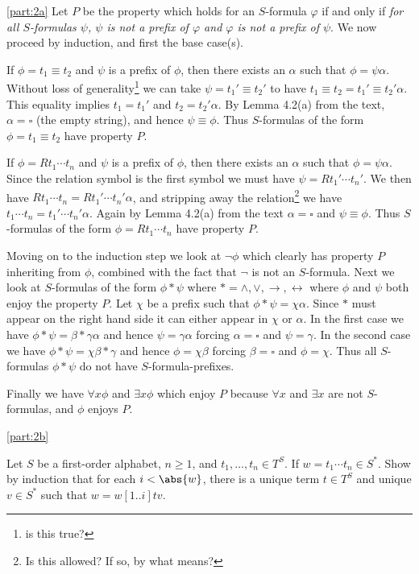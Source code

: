 \documentclass[boxes,pages,color=CornflowerBlue]{homework}
\begin{document}
\begin{solution}
    \ref{part:2a}
    Let $P$ be the property which holds for an $S$-formula $\varphi$ if and only if \emph{for all $S$-formulas $\psi$, $\psi$ is not a prefix of $\varphi$ and $\varphi$ is not a prefix of $\psi$}.
    We now proceed by induction, and first the base case(s).

    If $\phi = t_1 \equiv t_2$ and $\psi$ is a prefix of $\phi$, then there exists an $\alpha$ such that $\phi = \psi\alpha$.
    Without loss of generality\footnote{is this true?} we can take $\psi = t_1' \equiv t_2'$ to have $t_1 \equiv t_2 = t_1' \equiv t_2'\alpha$.
    This equality implies $t_1 = t_1'$ and $t_2 = t_2'\alpha$.
    By Lemma 4.2(a) from the text, $\alpha = \square$ (the empty string), and hence $\psi \equiv \phi$.
    Thus $S$-formulas of the form $\phi = t_1 \equiv t_2$ have property $P$.

    If $\phi = Rt_1\cdots t_n$ and $\psi$ is a prefix of $\phi$, then there exists an $\alpha$ such that $\phi = \psi\alpha$.
    Since the relation symbol is the first symbol we must have $\psi = Rt_1'\cdots t_n'$.
    We then have $Rt_1\cdots t_n = Rt_1'\cdots t_n'\alpha$, and stripping away the relation\footnote{Is this allowed? If so, by what means?} we have $t_1\cdots t_n = t_1'\cdots t_n'\alpha$.
    Again by Lemma 4.2(a) from the text $\alpha = \square$ and $\psi \equiv \phi$.
    Thus $S$-formulas of the form $\phi = Rt_1 \cdots t_n$ have property $P$.

    Moving on to the induction step we look at $\neg\phi$ which clearly has property $P$ inheriting from $\phi$, combined with the fact that $\neg$ is not an $S$-formula.
    Next we look at $S$-formulas of the form $\phi * \psi$ where $* = \wedge, \vee, \rightarrow, \leftrightarrow$ where $\phi$ and $\psi$ both enjoy the property $P$.
    Let $\chi$ be a prefix such that $\phi * \psi = \chi\alpha$.
    Since $*$ must appear on the right hand side it can either appear in $\chi$ or $\alpha$.
    In the first case we have $\phi * \psi = \beta * \gamma\alpha$ and hence $\psi = \gamma\alpha$ forcing $\alpha = \square$ and $\psi = \gamma$.
    In the second case we have $\phi * \psi = \chi\beta * \gamma$ and hence $\phi = \chi\beta$ forcing $\beta = \square$ and $\phi = \chi$.
    Thus all $S$-formulas $\phi * \psi$ do not have $S$-formula-prefixes.

    Finally we have $\forall x \phi$ and $\exists x \phi$ which enjoy $P$ because $\forall x$ and $\exists x$ are not $S$-formulas, and $\phi$ enjoys $P$.


    \ref{part:2b}
\end{solution}

\begin{problem}
Let $S$ be a first-order alphabet, $n\ge 1$, and $t_1, \ldots,t_n \in T^S$.
If $w = t_1 \cdots t_n \in S^*$.
Show by induction that for each $i < \abs{w}$, there is a unique term $t \in T^S$ and unique $v \in S^*$ such that $w = w[1..i] t v$.
\end{problem}

\begin{solution}

\end{solution}
\end{document}
